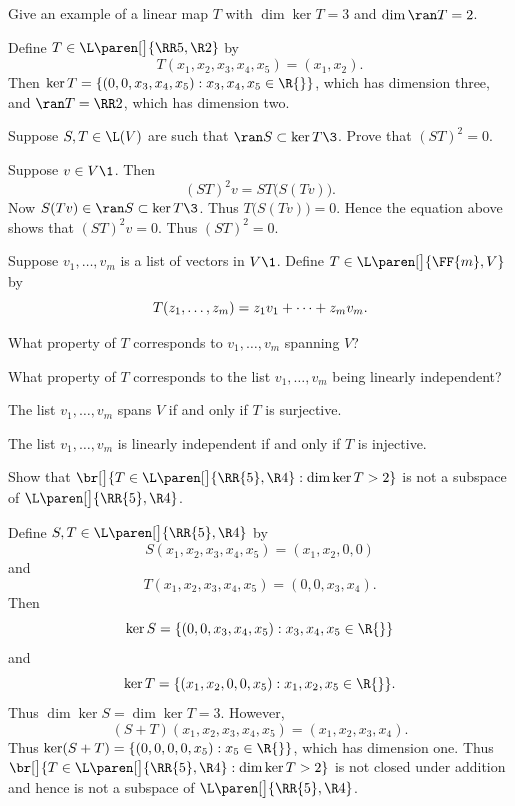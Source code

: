 
\exercise
Give an example of a linear map $T$ with $\dim \ker T = 3$ and $\dim \ran T = 2$.

\begin{Solution}
Define $T \in \L\paren[\big]{\RR5, \R2}$ by
\[
T(x_1, x_2, x_3, x_4, x_5) = (x_1, x_2).
\]
Then $\ker T = \{ (0, 0, x_3, x_4, x_5) : x_3, x_4, x_5 \in \R{} \}$, which has dimension three, and
$\ran T = \RR2$, which has dimension two.
\end{Solution}

\exercise
Suppose $S, T \in \L(V)$ are such that
$
\ran S \subset \ker T\3$.
Prove that $(ST)^2 = 0$.

\begin{Solution}
Suppose $v \in V\1$. Then
\[
(ST)^2 v = ST\bigl(S(Tv)\bigr).
\]
Now $S(Tv) \in \ran S \subset \ker T\3$. Thus $T\bigl(S(Tv)\bigr) = 0$. Hence the equation above shows that
$(ST)^2 v = 0$. Thus $(ST)^2 = 0$.
\end{Solution}

\exercise
Suppose $v_1, \dots, v_m$ is a list of vectors in $V\1$.  Define $T \in \L\paren[\big]{\FF{m}, V}$ by
\[ \addtolength{\belowdisplayskip}{-3bp}
T(z_1, \dots, z_m) = z_1 v_1 + \dots + z_m v_m.
\]
\begin{subtheorem}
\item
What property of $T$ corresponds to $v_1, \dots, v_m$ spanning $V$?
\item
What property of $T$ corresponds to the list $v_1, \dots, v_m$ being linearly \mbox{independent}?
\end{subtheorem}
\exercisesubtheoremend

\begin{Solution}
\begin{subtheorem}
\item
The list $v_1, \dots, v_m$ spans $V$ if and only if $T$ is surjective.
\item
The list $v_1, \dots, v_m$ is linearly independent if and only if $T$ is injective.
\end{subtheorem}
\end{Solution}

\exercise
Show that
$
\br[\big]{T \in \L\paren[\big]{\RR{5}, \R4}: \dim \ker T > 2}
$
is not a subspace of $ \L\paren[\big]{\RR{5}, \R4}$.

\begin{Solution}
Define $S, T \in \L\paren[\big]{\RR{5}, \R4}$ by
\[
S(x_1, x_2, x_3, x_4, x_5) = (x_1, x_2, 0, 0)
\]
and
\[
T(x_1, x_2, x_3, x_4, x_5) = (0, 0, x_3, x_4).
\]
Then
\[
\ker S = \{(0, 0, x_3, x_4, x_5): x_3, x_4, x_5 \in \R{} \}
\]
and
\[
\ker T = \{(x_1, x_2, 0, 0, x_5): x_1, x_2, x_5 \in \R{} \}.
\]
Thus $\dim \ker S = \dim \ker T = 3$. However,
\[
(S + T)(x_1, x_2, x_3, x_4, x_5) = (x_1, x_2, x_3, x_4).
\]
Thus $\ker(S + T) = \{ (0, 0, 0, 0, x_5): x_5 \in \R{} \}$, which has dimension one. Thus
$\br[\big]{T \in \L\paren[\big]{\RR{5}, \R4}: \dim \ker T > 2}$ is not closed under addition and hence is not a subspace of $ \L\paren[\big]{\RR{5}, \R4}$.
\end{Solution}

